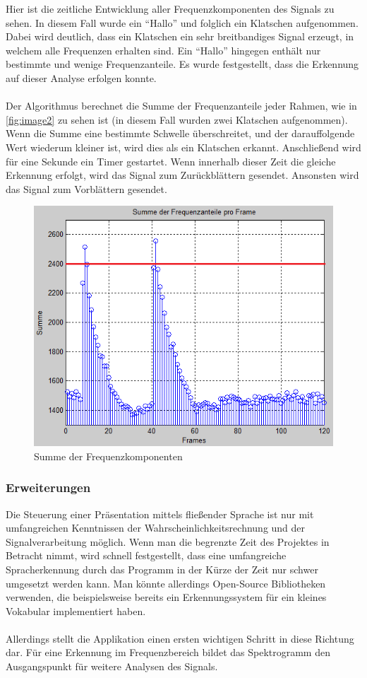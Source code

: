 Hier ist die zeitliche Entwicklung aller Frequenzkomponenten des Signals zu sehen. In diesem Fall wurde ein "`Hallo"' und folglich ein Klatschen aufgenommen. Dabei wird deutlich, dass ein Klatschen ein sehr breitbandiges Signal erzeugt, in welchem alle Frequenzen erhalten sind. Ein "`Hallo"' hingegen enthält nur bestimmte und wenige Frequenzanteile. Es wurde festgestellt, dass die Erkennung auf dieser Analyse erfolgen konnte. \\
\\
Der Algorithmus berechnet die Summe der Frequenzanteile jeder Rahmen, wie in \autoref{fig:image2} zu sehen ist (in diesem Fall wurden zwei Klatschen aufgenommen). Wenn die Summe eine bestimmte Schwelle überschreitet, und der darauffolgende Wert wiederum kleiner ist, wird dies als ein Klatschen erkannt. Anschließend wird für eine Sekunde ein Timer gestartet. Wenn innerhalb dieser Zeit die gleiche Erkennung erfolgt, wird das Signal zum Zurückblättern gesendet. Ansonsten wird das Signal zum Vorblättern gesendet.

\begin{figure}[h]
	\centering
	\includegraphics[width=1\textwidth]{beatcontrol/BeatBilder/bild2.png}
	\caption{Summe der Frequenzkomponenten}
	\label{fig:image2}
\end{figure}

\subsubsection{Erweiterungen}
Die Steuerung einer Präsentation mittels fließender Sprache ist nur mit umfangreichen Kenntnissen der Wahrscheinlichkeitsrechnung und der Signalverarbeitung möglich. Wenn man die begrenzte Zeit des Projektes in Betracht nimmt, wird schnell festgestellt, dass  eine umfangreiche Spracherkennung durch das Programm in der Kürze der Zeit nur schwer umgesetzt werden kann. Man könnte allerdings Open-Source Bibliotheken verwenden, die beispielsweise bereits ein Erkennungssystem für ein kleines Vokabular implementiert haben.\\
\\
Allerdings stellt die Applikation einen ersten wichtigen Schritt in diese Richtung dar. Für eine Erkennung im Frequenzbereich bildet das Spektrogramm den Ausgangspunkt für weitere Analysen des Signals. 

